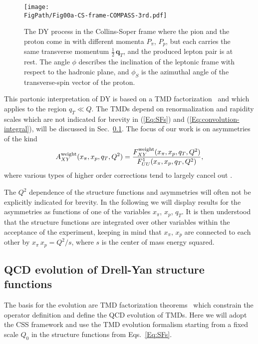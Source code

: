 \documentclass[a4paper]{article}
\newcommand{\be}{\begin{equation}}
\newcommand{\ee}{\end{equation}}
\def\qT{\bm q_T}
\newcommand*{\FigPath}{./figs}%
\begin{document}
\begin{figure}[t!] 
\centering 
\texttt{[image: \\FigPath/Fig00a-CS-frame-COMPASS-3rd.pdf]}
\caption{\label{Fig-01:kinematics} 
    The DY process in the Collins-Soper frame where the pion
    and the proton come in with different momenta $P_\pi$, $P_p$, but each
    carries the same transverse momentum $\frac12\,\qT$, and 
    the produced lepton pair is at rest. The angle $\phi$ describes the 
    inclination of the leptonic frame with respect to the hadronic plane, 
    and $\phi_S$ is the azimuthal angle of the transverse-spin vector 
    of the proton.
    }
\end{figure}


This partonic interpretation of DY is based on a TMD factorization~\cite{Collins:1984kg,Collins:2011zzd} and
which applies to the region $q_T\ll Q$. 
The TMDs depend on renormalization and rapidity scales which are not
indicated for brevity in (\ref{Eq:SFs}) and (\ref{Eq:convolution-integral}), will be discussed in Sec.~\ref{sec-2.2}.
The focus of our work is on asymmetries of the kind
\be
 \label{Eq:Asym.def} 
    A_{XY}^{\rm weight}(x_\pi, x_p , q_T, Q^2)= 
    \frac{F_{XY}^{\rm weight}(x_\pi, x_p , q_T, Q^2)}{F_{UU}^1(x_\pi, x_p , q_T, Q^2)},
\ee 
where various types of higher order corrections tend to largely 
cancel out \cite{Ratcliffe:1982yj,Weber:1991wd,Vogelsang:1992jn,
Contogouris:1994ws,Gehrmann:1997pi,Bunce:2000uv,Shimizu:2005fp}.

The $Q^2$ dependence of the structure functions and asymmetries will often
not be explicitly indicated for brevity. 
In the following we will display results for the asymmetries as functions 
of one of the variables $x_\pi$, $x_p$, $q_T$. It is then understood that 
the structure functions are integrated over  other variables 
within the acceptance of the experiment, keeping in mind that $x_\pi, \, x_p$
are connected to each other by $x_\pi \, x_p = Q^2/s$, where  $s$ is the center of mass energy squared.
 
 
\subsection{QCD evolution of Drell-Yan structure functions}
\label{sec-2.2} 

The basis for the evolution  are TMD factorization theorems~\cite{Collins:1981uk,Collins:1984kg,Qiu:1991pp,Ji:2004wu,Ji:2006br,Ji:2006vf,Collins:2011zzd,Aybat:2011zv,Ma:2013aca,Collins:2014jpa,Collins:2016hqq,Scimemi:2018xaf}
which constrain the operator definition 
and define the QCD evolution of TMDs. 
Here we will adopt the CSS framework 
and use the TMD evolution formalism starting from a fixed scale $Q_0$
\cite{Collins:2014jpa} in the structure functions from  Eqs.~\eqref{Eq:SFs}. 
 
\end{document}
